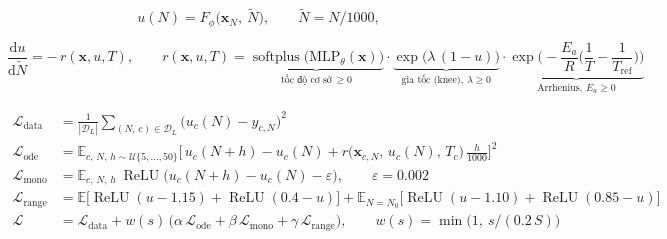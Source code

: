 
\begin{equation}
  u(N) = F_{\phi}\big(\mathbf{x}_N,\ \tilde N\big), \qquad \tilde N = N/1000,
  \label{eq:solution}
\end{equation}

\begin{equation}
  \frac{\mathrm{d}u}{\mathrm{d}\tilde N} = -\,r(\mathbf{x}, u, T), \qquad
  r(\mathbf{x}, u, T) = \underbrace{\operatorname{softplus}\!\big(\mathrm{MLP}_{\theta}(\mathbf{x})\big)}_{\text{tốc độ cơ sở}\ \ge 0}
  \cdot \underbrace{\exp\!\big(\lambda\,(1-u)\big)}_{\text{gia tốc (knee)},\ \lambda\ge 0}
  \cdot \underbrace{\exp\!\Big(-\frac{E_a}{R}\Big(\frac{1}{T}-\frac{1}{T_{\mathrm{ref}}}\Big)\Big)}_{\text{Arrhenius},\ E_a \ge 0}
  \label{eq:dynamics}
\end{equation}

\begin{align}
  \mathcal{L}_{\text{data}} &= \frac{1}{|\mathcal{D}_L|}\sum_{(N,\,c)\in\mathcal{D}_L}\big(u_c(N) - y_{c,N}\big)^2
  \label{eq:ldata}\\[4pt]
  \mathcal{L}_{\text{ode}}  &= \mathbb{E}_{c,\,N,\,h\sim\mathcal{U}\{5,\dots,50\}}
      \Big[\,u_c(N{+}h) - u_c(N) + r\big(\mathbf{x}_{c,N},\,u_c(N),\,T_c\big)\,\tfrac{h}{1000}\Big]^2
  \label{eq:lode}\\[4pt]
  \mathcal{L}_{\text{mono}} &= \mathbb{E}_{c,\,N,\,h}\ \operatorname{ReLU}\!\big(u_c(N{+}h) - u_c(N) - \varepsilon\big), \qquad \varepsilon = 0.002
  \label{eq:lmono}\\[4pt]
  \mathcal{L}_{\text{range}} &= \mathbb{E}\big[\operatorname{ReLU}(u-1.15)+\operatorname{ReLU}(0.4-u)\big]
      + \mathbb{E}_{N=N_0}\big[\operatorname{ReLU}(u-1.10)+\operatorname{ReLU}(0.85-u)\big]
  \label{eq:lrange}\\[4pt]
  \mathcal{L} &= \mathcal{L}_{\text{data}} + w(s)\,\big(\alpha\,\mathcal{L}_{\text{ode}} + \beta\,\mathcal{L}_{\text{mono}} + \gamma\,\mathcal{L}_{\text{range}}\big),
  \qquad w(s)=\min\!\big(1,\ s/(0.2\,S)\big)
  \label{eq:total}
\end{align}

